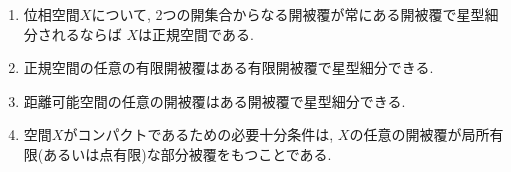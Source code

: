 \documentclass[uplatex, dvipdfmx, a4paper, 12pt, class=jsarticle, crop=false]{standalone}
\begin{document}
\begin{problem}[5.1.A]\label{eng-5-1-A-problem}
    \begin{enumerate}
        \item {}位相空間\(X\)について,
        2つの開集合からなる開被覆が常にある開被覆で星型細分されるならば
        \(X\)は正規空間である.

        \item 正規空間の任意の有限開被覆はある有限開被覆で星型細分できる.

        \item 距離可能空間の任意の開被覆はある開被覆で星型細分できる.

        \item \Hausdorff 空間\(X\)がコンパクトであるための必要十分条件は,
        \(X\)の任意の開被覆が局所有限(あるいは点有限)な部分被覆をもつことである.
    \end{enumerate}
\end{problem}
\end{document}
